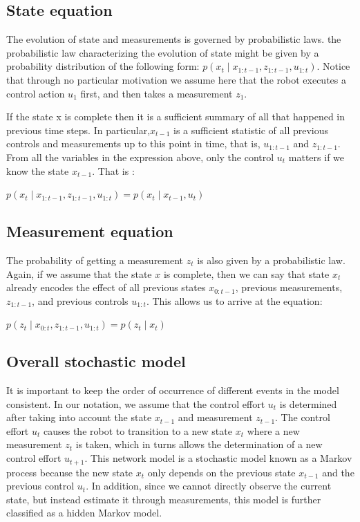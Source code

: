 \documentclass[twoside]{article}
\begin{document}
 \subsection{State equation}
 The evolution of state and measurements is governed by probabilistic laws. the probabilistic law characterizing
the evolution of state might be given by a probability distribution
of the following form: $p(x_t \mid x_{1:t-1}, z_{1:t-1}, u_{1:t})$. Notice that through no particular
motivation we assume here that the robot executes a control action $u_1$ first, and then takes a measurement $z_1$.

 If the state x is complete then it is a
sufficient summary of all that happened in previous time steps. In particular,$x_{t-1}$ is a sufficient statistic of all previous controls and measurements up to this point in time, that is, $u_{1:t-1}$ and $z_{1:t-1}$. From all the variables in the
expression above, only the control $u_t$ matters if we know the state $x_{t-1}$. That is :

\begin{center}
$p(x_t \mid x_{1:t-1}, z_{1:t-1}, u_{1:t}) = p(x_t \mid x_{t-1},u_t)$
\end{center}

\subsection{Measurement equation}
The probability of getting a measurement $z_t$ is also given by a probabilistic law. Again, if we assume that the state $x$ is complete, then we can say that state $x_t$ already encodes the effect of all previous states $x_{0:t-1}$, previous measurements, $z_{1:t-1}$, and previous controls $u_{1:t}$. This allows us to arrive at the equation:  

\begin{center}
$p(z_t \mid x_{0:t},z_{1:t-1},u_{1:t})=p(z_t\mid x_t)$
\end{center}

\subsection{Overall stochastic model}
It is important to keep the order of occurrence of different events in the model consistent. In our notation, we assume that the control effort $u_t$ is determined after taking into account the state $x_{t-1}$ and measurement $z_{t-1}$. The control effort $u_t$ causes the robot to transition to a new state $x_t$ where a new measurement $z_t$ is taken, which in turns allows the determination of a new control effort $u_{t+1}$. This network model is a stochastic model known as a Markov process because the new state $x_t$ only depends on the previous state $x_{t-1}$ and the previous control $u_t$. In addition, since we cannot directly observe the current state, but instead estimate it through measurements, this model is further classified as a hidden Markov model. 
\end{document}
